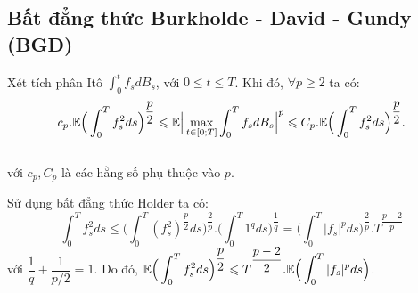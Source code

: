 \subsection{Bất đẳng thức Burkholde - David - Gundy (BGD)} Xét tích phân Itô $\displaystyle \int_0^tf_sdB_s$, với $0\leqslant t\leqslant T$. Khi đó, $\forall p\geqslant 2$ ta có: 
\[ c_p.\mathbb{E}\Big(\displaystyle \int_0^T f_s^2ds\Big)^{\dfrac{p}{2}} \leqslant \mathbb{E}\Big|\displaystyle\max_{t\in[0;T]}\displaystyle \int_0^Tf_sdB_s\Big|^p \leqslant C_p.\mathbb{E}\Big(\displaystyle \int_0^Tf_s^2ds\Big)^{\dfrac{p}{2}}.\]\\ với $c_p, C_p$ là các hằng số phụ thuộc vào $p$.
\begin{remark*}
Sử dụng bất đẳng thức Holder ta có: 
\[\displaystyle \int_0^Tf_s^2ds \leqslant \Big(\displaystyle \int_0^T(f_s^2)^{\dfrac{p}{2}}ds\Big)^{\dfrac{2}{p}}.\Big(\displaystyle \int_0^T1^qds\Big)^{\dfrac{1}{q}} = \Big(\displaystyle \int_0^T|f_s|^pds\Big)^{\dfrac{2}{p}}.T^{\dfrac{p-2}{p}}\] với $\dfrac{1}{q} + \dfrac{1}{p/2} =1$. Do đó, $\mathbb{E}\Big(\displaystyle \int_0^Tf_s^2ds\Big)^{\dfrac{p}{2}} \leqslant T^{\dfrac{p-2}{2}}.\mathbb{E}\Big(\displaystyle \int_0^T|f_s|^pds\Big)$.
\end{remark*}
